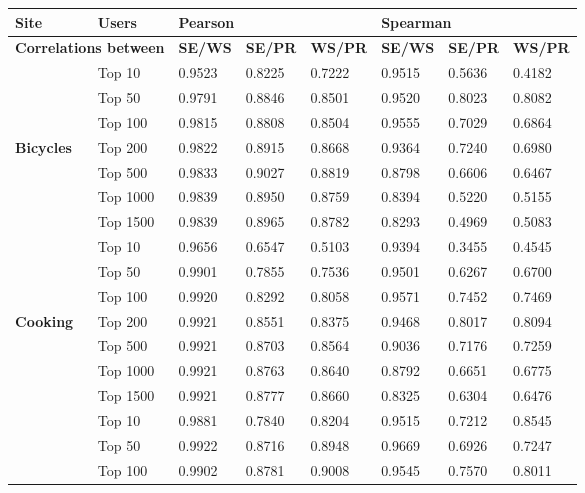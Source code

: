 \documentclass[]{final_report}
\begin{document}
\begin{minipage}{\linewidth}
\centering
\begin{tabular}{|l|l||l|l|l||l|l|l|}
\hline
\textbf{Site} & \textbf{Users} & \multicolumn{3}{l||}{\textbf{Pearson}} & \multicolumn{3}{l|}{\textbf{Spearman}} \\ \hline
\multicolumn{2}{|l||}{\textbf{Correlations between}} & \textbf{SE/WS} & \textbf{SE/PR} & \textbf{WS/PR} & \textbf{SE/WS} & \textbf{SE/PR} & \textbf{WS/PR} \\
\hline
~ 					& Top 10 	& 0.9523 & 0.8225 & 0.7222 & 0.9515 & 0.5636 & 0.4182 \\      
~					& Top 50 	& 0.9791 & 0.8846 & 0.8501 & 0.9520 & 0.8023 & 0.8082 \\
~					& Top 100	& 0.9815 & 0.8808 & 0.8504 & 0.9555 & 0.7029 & 0.6864 \\
\textbf{Bicycles}	& Top 200	& 0.9822 & 0.8915 & 0.8668 & 0.9364 & 0.7240 & 0.6980 \\
~					& Top 500	& 0.9833 & 0.9027 & 0.8819 & 0.8798 & 0.6606 & 0.6467 \\
~					& Top 1000	& 0.9839 & 0.8950 & 0.8759 & 0.8394 & 0.5220 & 0.5155 \\
~					& Top 1500  & 0.9839 & 0.8965 & 0.8782 & 0.8293 & 0.4969 & 0.5083 \\
\hline
~           		& Top 10 	& 0.9656 & 0.6547 & 0.5103 & 0.9394 & 0.3455 & 0.4545 \\
~				    & Top 50 	& 0.9901 & 0.7855 & 0.7536 & 0.9501 & 0.6267 & 0.6700 \\
~          			& Top 100 	& 0.9920 & 0.8292 & 0.8058 & 0.9571 & 0.7452 & 0.7469 \\
\textbf{Cooking}	& Top 200 	& 0.9921 & 0.8551 & 0.8375 & 0.9468 & 0.8017 & 0.8094 \\
~          			& Top 500 	& 0.9921 & 0.8703 & 0.8564 & 0.9036 & 0.7176 & 0.7259 \\
~          			& Top 1000	& 0.9921 & 0.8763 & 0.8640 & 0.8792 & 0.6651 & 0.6775 \\
~          			& Top 1500	& 0.9921 & 0.8777 & 0.8660 & 0.8325 & 0.6304 & 0.6476 \\
\hline
~           		& Top 10 	& 0.9881 & 0.7840 & 0.8204 & 0.9515 & 0.7212 & 0.8545 \\
~					& Top 50 	& 0.9922 & 0.8716 & 0.8948 & 0.9669 & 0.6926 & 0.7247 \\
~           		& Top 100   & 0.9902 & 0.8781 & 0.9008 & 0.9545 & 0.7570 & 0.8011 \\

\end{tabular}
\end{minipage}
\end{document}
